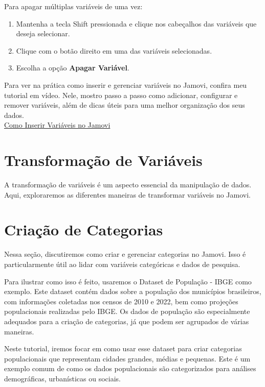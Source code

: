 Para apagar múltiplas variáveis de uma vez:
\begin{enumerate}
    \item Mantenha a tecla Shift pressionada e clique nos cabeçalhos das variáveis que deseja selecionar.
    \item Clique com o botão direito em uma das variáveis selecionadas.
    \item Escolha a opção \textbf{Apagar Variável}.
\end{enumerate}

\begin{tcolorbox}[colback=white,colframe=red,title={\faPlayCircle \ Dica de Conteúdo}]
  Para ver na prática como inserir e gerenciar variáveis no Jamovi, confira meu tutorial em vídeo. Nele, mostro passo a passo como adicionar, configurar e remover variáveis, além de dicas úteis para uma melhor organização dos seus dados.\\
  \textcolor{red}{\faYoutube} \href{https://youtu.be/UqEnetiHEns?si=qvTd5AucIA88QR3j}{Como Inserir Variáveis no Jamovi}
\end{tcolorbox}


\section{Transformação de Variáveis}
A transformação de variáveis é um aspecto essencial da manipulação de dados. Aqui, exploraremos as diferentes maneiras de transformar variáveis no Jamovi.

\section{Criação de Categorias}
Nessa seção, discutiremos como criar e gerenciar categorias no Jamovi. Isso é particularmente útil ao lidar com variáveis categóricas e dados de pesquisa.

Para ilustrar como isso é feito, usaremos o Dataset de População - IBGE como exemplo. Este dataset contém dados sobre a população dos municípios brasileiros, com informações coletadas nos censos de 2010 e 2022, bem como projeções populacionais realizadas pelo IBGE. Os dados de população são especialmente adequados para a criação de categorias, já que podem ser agrupados de várias maneiras.

Neste tutorial, iremos focar em como usar esse dataset para criar categorias populacionais que representam cidades grandes, médias e pequenas. Este é um exemplo comum de como os dados populacionais são categorizados para análises demográficas, urbanísticas ou sociais.

